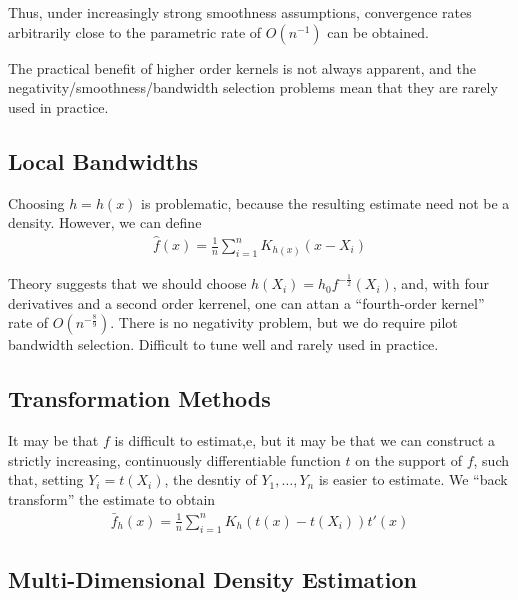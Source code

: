 Thus, under increasingly strong smoothness assumptions, convergence
rates arbitrarily close to the parametric rate of $O(n^{-1})$ can be
obtained.

The practical benefit of higher order kernels is not always apparent,
and the negativity/smoothness/bandwidth selection problems mean that
they are rarely used in practice.

\subsection{Local Bandwidths}
\label{sec:local-bandwidths}

Choosing $h = h(x)$  is problematic, because the resulting estimate
need not be a density.  However, we can define
\begin{align}
  \label{eq:45}
  \hat f(x) = \frac{1}{n} \sum_{i=1}^{n} K_{h(x)}(x - X_{i})
\end{align}

Theory suggests that we should choose $h(X_{i}) = h_{0}
f^{-\frac{1}{2}}(X_{i})$, and, with four derivatives and a second
order kerrenel, one can attan a ``fourth-order kernel'' rate of
$O(n^{-\frac{8}{9}})$.  There is no negativity problem, but we do
require pilot bandwidth selection.  Difficult to tune well and rarely
used in practice.

\subsection{Transformation Methods}
\label{sec:transf-meth}

It may be that $f$ is difficult to estimat,e, but it may be that we
can construct a strictly increasing, continuously differentiable
function $t$ on the support of $f$, such that, setting $Y_{i} =
t(X_{i})$, the desntiy of $Y_{1}, \dots, Y_{n}$ is easier to estimate.
We ``back transform'' the estimate to obtain
\begin{align}
  \label{eq:46}
  \bar f_{h}(x) = \frac{1}{n} \sum_{i=1}^{n} K_{h}(t(x) - t(X_{i})) t'(x)
\end{align}

\subsection{Multi-Dimensional Density Estimation}
\label{sec:multi-dimens-dens}

